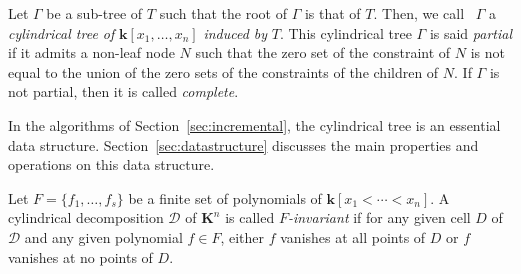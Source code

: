 \documentclass[10pt]{article}
\def\K {\ensuremath{\mathbf{k}}}
\def\KK {\ensuremath{\mathbf{K}}}
\def\DD {\ensuremath{\mathcal{D}}}
\def\TT {\ensuremath{T}}
\begin{document}
Let $\Gamma$ be a sub-tree of ${\TT}$ such that
the root of $\Gamma$ is that of ${\TT}$.
Then, we call \, $\Gamma$ a {\em cylindrical tree of} $\K[x_1,\ldots,x_n]$
{\em induced by} ${\TT}$.
This cylindrical tree $\Gamma$ is said {\em partial} if it admits
a non-leaf node $N$ such that
the zero set of the constraint of $N$ is not equal
to the union of the zero sets of the constraints
of the children of $N$.
If $\Gamma$ is not partial, then it is called {\em complete}.

In the algorithms of Section~\ref{sec:incremental},
the cylindrical tree is an essential data structure.
Section~\ref{sec:datastructure} discusses the
main properties and operations on this data structure.


Let $F=\{f_1,\ldots,f_s\}$ be a finite set of polynomials 
of $\K[x_1<\cdots<x_n]$. 
A cylindrical decomposition ${\DD}$ of $\KK^n$ is 
called {\em $F$-invariant}
if for any given cell $D$ of  ${\DD}$ and any given polynomial $f\in F$, 
either $f$ vanishes at all points of $D$ or $f$ vanishes at no points of $D$.
\end{document}

